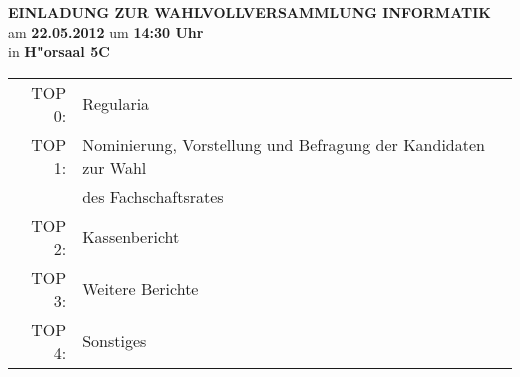 \documentclass[a4paper,12pt, landscape]{article}
\begin{document}
\begin{center}
\thispagestyle{empty}

\vspace*{8ex}
\huge \textbf{EINLADUNG ZUR WAHLVOLLVERSAMMLUNG INFORMATIK}\\[2ex]
\huge am \textbf{22.05.2012} um \textbf{14:30 Uhr}\\
in \textbf{H"orsaal 5C}\\[6ex]

\LARGE
\begin{tabular}{rl}
TOP 0: &Regularia\\
TOP 1: &Nominierung, Vorstellung und Befragung der Kandidaten zur Wahl\\ & des Fachschaftsrates\\
TOP 2: &Kassenbericht\\
TOP 3: &Weitere Berichte\\
TOP 4: &Sonstiges
\end{tabular}

\end{center}
\end{document}
